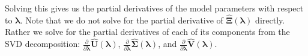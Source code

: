 \documentclass[12pt,letterpaper]{article}
\begin{document}
 Solving this gives us the partial derivatives of the model parameters with respect to $\boldsymbol{\lambda}$. Note that we do not solve for the partial derivative of $\hat{\boldsymbol{\Xi}}(\boldsymbol{\lambda})$ directly. Rather we solve for the partial derivatives of each of its components from the SVD decomposition:
$\frac{\partial}{\partial \boldsymbol{\lambda}}\hat{\boldsymbol{U}}(\boldsymbol{\lambda})$, $\frac{\partial}{\partial \boldsymbol{\lambda}}\hat{\boldsymbol{\Sigma}}(\boldsymbol{\lambda})$, and $\frac{\partial}{\partial \boldsymbol{\lambda}}\hat{\boldsymbol{V}}(\boldsymbol{\lambda})$. 



\end{document}
